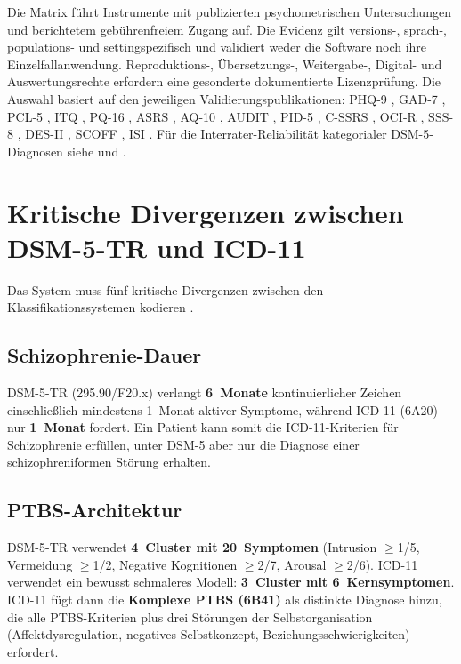\documentclass[11pt,a4paper]{article}
\begin{document}
Die Matrix f\"uhrt Instrumente mit publizierten psychometrischen Untersuchungen und berichtetem geb\"uhrenfreiem Zugang auf. Die Evidenz gilt versions-, sprach-, populations- und settingspezifisch und validiert weder die Software noch ihre Einzelfallanwendung. Reproduktions-, \"Ubersetzungs-, Weitergabe-, Digital- und Auswertungsrechte erfordern eine gesonderte dokumentierte Lizenzpr\"ufung. Die Auswahl basiert auf den jeweiligen Validierungspublikationen: PHQ-9 \citep{Levis2019}, GAD-7 \citep{Spitzer2006}, PCL-5 \citep{Blevins2015}, ITQ \citep{Cloitre2018}, PQ-16 \citep{Ising2012}, ASRS \citep{Kessler2005}, AQ-10 \citep{Allison2012}, AUDIT \citep{Saunders1993}, PID-5 \citep{OltmannsWidiger2018, Riegel2021}, C-SSRS \citep{Posner2011}, OCI-R \citep{Foa2002}, SSS-8 \citep{Gierk2014}, DES-II \citep{CarlsonPutnam1993}, SCOFF \citep{Morgan1999}, ISI \citep{Morin2011}. F\"ur die Interrater-Reliabilit\"at kategorialer DSM-5-Diagnosen siehe \citet{Regier2013} und \citet{Aboraya2006}.


\section{Kritische Divergenzen zwischen DSM-5-TR und ICD-11}
\label{sec:divergenzen}

Das System muss f\"unf kritische Divergenzen zwischen den Klassifikationssystemen kodieren \citep{Keeley2016}.

\subsection{Schizophrenie-Dauer}

DSM-5-TR (295.90/F20.x) verlangt \textbf{6~Monate} kontinuierlicher Zeichen einschlie\ss{}lich mindestens 1~Monat aktiver Symptome, w\"ahrend ICD-11 (6A20) nur \textbf{1~Monat} fordert. Ein Patient kann somit die ICD-11-Kriterien f\"ur Schizophrenie erf\"ullen, unter DSM-5 aber nur die Diagnose einer schizophreniformen St\"orung erhalten.

\subsection{PTBS-Architektur}

DSM-5-TR verwendet \textbf{4~Cluster mit 20~Symptomen} (Intrusion $\geq$1/5, Vermeidung $\geq$1/2, Negative Kognitionen $\geq$2/7, Arousal $\geq$2/6). ICD-11 verwendet ein bewusst schmaleres Modell: \textbf{3~Cluster mit 6~Kernsymptomen}. ICD-11 f\"ugt dann die \textbf{Komplexe PTBS (6B41)} als distinkte Diagnose hinzu, die alle PTBS-Kriterien plus drei St\"orungen der Selbstorganisation (Affektdysregulation, negatives Selbstkonzept, Beziehungsschwierigkeiten) erfordert.
\end{document}
